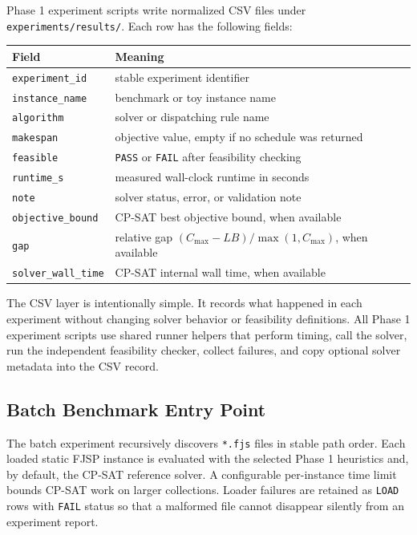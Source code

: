 ﻿\documentclass[11pt]{article}
\begin{document}
Phase 1 experiment scripts write normalized CSV files under
\texttt{experiments/results/}. Each row has the following fields:

\begin{table}[h]
\centering
\begin{tabular}{ll}
\toprule
Field & Meaning \\
\midrule
\texttt{experiment\_id} & stable experiment identifier \\
\texttt{instance\_name} & benchmark or toy instance name \\
\texttt{algorithm} & solver or dispatching rule name \\
\texttt{makespan} & objective value, empty if no schedule was returned \\
\texttt{feasible} & \texttt{PASS} or \texttt{FAIL} after feasibility checking \\
\texttt{runtime\_s} & measured wall-clock runtime in seconds \\
\texttt{note} & solver status, error, or validation note \\
\texttt{objective\_bound} & CP-SAT best objective bound, when available \\
\texttt{gap} & relative gap $(C_{\max}-LB)/\max(1,C_{\max})$, when available \\
\texttt{solver\_wall\_time} & CP-SAT internal wall time, when available \\
\bottomrule
\end{tabular}
\end{table}

The CSV layer is intentionally simple. It records what happened in each
experiment without changing solver behavior or feasibility definitions.
All Phase 1 experiment scripts use shared runner helpers that perform timing,
call the solver, run the independent feasibility checker, collect failures,
and copy optional solver metadata into the CSV record.

\subsection{Batch Benchmark Entry Point}

The batch experiment recursively discovers \texttt{*.fjs} files in stable path
order. Each loaded static FJSP instance is evaluated with the selected Phase 1
heuristics and, by default, the CP-SAT reference solver. A configurable
per-instance time limit bounds CP-SAT work on larger collections. Loader
failures are retained as \texttt{LOAD} rows with \texttt{FAIL} status so that a
malformed file cannot disappear silently from an experiment report.
\end{document}
